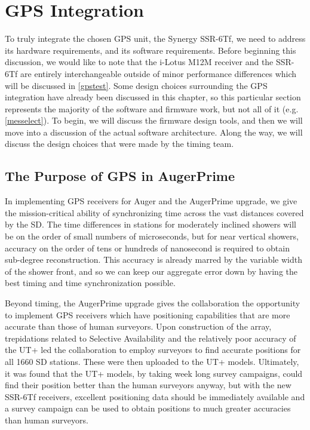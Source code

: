 \section{GPS Integration}
\label{integration}
To truly integrate the chosen GPS unit, the Synergy SSR-6Tf, we need to address its hardware requirements, and its software requirements. Before beginning this discussion, we would like to note that the i-Lotus M12M receiver and the SSR-6Tf are entirely interchangeable outside of minor performance differences which will be discussed in \autoref{gpstest}. Some design choices surrounding the GPS integration have already been discussed in this chapter, so this particular section represents the majority of the software and firmware work, but not all of it (e.g. \autoref{messelect}). To begin, we will discuss the firmware design tools, and then we will move into a discussion of the actual software architecture. Along the way, we will discuss the design choices that were made by the timing team.
\subsection{The Purpose of GPS in AugerPrime}
In implementing GPS receivers for Auger and the AugerPrime upgrade, we give the mission-critical ability of synchronizing time across the vast distances covered by the SD. The time differences in stations for moderately inclined showers will be on the order of small numbers of microseconds, but for near vertical showers, accuracy on the order of tens or hundreds of nanosecond is required to obtain sub-degree reconstruction. This accuracy is already marred by the variable width of the shower front, and so we can keep our aggregate error down by having the best timing and time synchronization possible. 

Beyond timing, the AugerPrime upgrade gives the collaboration the opportunity to implement GPS receivers which have positioning capabilities that are more accurate than those of human surveyors. Upon construction of the array, trepidations related to Selective Availability and the relatively poor accuracy of the UT+ led the collaboration to employ surveyors to find accurate positions for all 1660 SD stations. These were then uploaded to the UT+ models. Ultimately, it was found that the UT+ models, by taking week long survey campaigns, could find their position better than the human surveyors anyway, but with the new SSR-6Tf receivers, excellent positioning data should be immediately available and a survey campaign can be used to obtain positions to much greater accuracies than human surveyors. 

